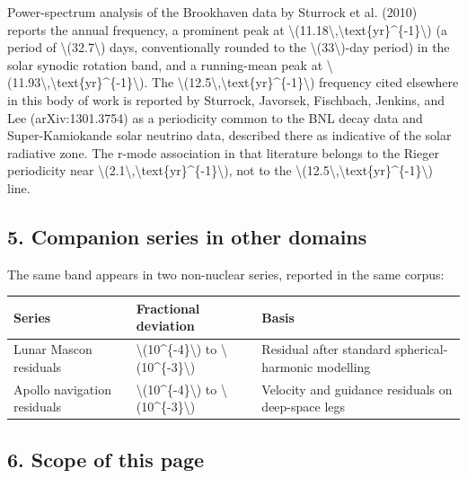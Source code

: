 \documentclass[
  10pt,
]{article}
\begin{document}
Power-spectrum analysis of the Brookhaven data by Sturrock et al. (2010)
reports the annual frequency, a prominent peak at
\textbackslash(11.18\textbackslash,\textbackslash text\{yr\}\^{}\{-1\}\textbackslash)
(a period of \textbackslash(32.7\textbackslash) days, conventionally
rounded to the \textbackslash(33\textbackslash)-day period) in the solar
synodic rotation band, and a running-mean peak at
\textbackslash(11.93\textbackslash,\textbackslash text\{yr\}\^{}\{-1\}\textbackslash).
The
\textbackslash(12.5\textbackslash,\textbackslash text\{yr\}\^{}\{-1\}\textbackslash)
frequency cited elsewhere in this body of work is reported by Sturrock,
Javorsek, Fischbach, Jenkins, and Lee (arXiv:1301.3754) as a periodicity
common to the BNL decay data and Super-Kamiokande solar neutrino data,
described there as indicative of the solar radiative zone. The r-mode
association in that literature belongs to the Rieger periodicity near
\textbackslash(2.1\textbackslash,\textbackslash text\{yr\}\^{}\{-1\}\textbackslash),
not to the
\textbackslash(12.5\textbackslash,\textbackslash text\{yr\}\^{}\{-1\}\textbackslash)
line.

\hypertarget{companion-series-in-other-domains}{%
\subsection{5. Companion series in other
domains}\label{companion-series-in-other-domains}}

The same band appears in two non-nuclear series, reported in the same
corpus:

\begin{longtable}[]{@{}lll@{}}
\toprule\noalign{}
Series & Fractional deviation & Basis \\
\midrule\noalign{}
\endhead
\bottomrule\noalign{}
\endlastfoot
Lunar Mascon residuals & \textbackslash(10\^{}\{-4\}\textbackslash) to
\textbackslash(10\^{}\{-3\}\textbackslash) & Residual after standard
spherical-harmonic modelling \\
Apollo navigation residuals & \textbackslash(10\^{}\{-4\}\textbackslash)
to \textbackslash(10\^{}\{-3\}\textbackslash) & Velocity and guidance
residuals on deep-space legs \\
\end{longtable}

\hypertarget{scope-of-this-page}{%
\subsection{6. Scope of this page}\label{scope-of-this-page}}
\end{document}
